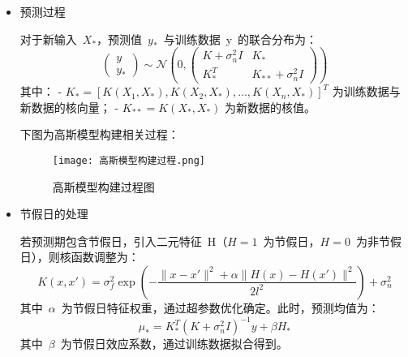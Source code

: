 \documentclass[withoutpreface,bwprint]{cumcmthesis}
\begin{document}
\begin{itemize}
    \item 预测过程
    \par
    对于新输入 \(X_*\)，预测值 \(y_*\) 与训练数据 y 的联合分布为：
    \begin{equation}
        \begin{pmatrix}
            y \\
            y_*
        \end{pmatrix} \sim \mathcal{N}\left( 0, \begin{pmatrix}
            K + \sigma_n^2 I & K_* \\
            K_*^T & K_{**} + \sigma_n^2 I
        \end{pmatrix} \right)
    \end{equation}
    其中： - \( K_* = [K(X_1, X_*), K(X_2, X_*), \dots, K(X_n, X_*)]^T \) 为训练数据与新数据的核向量； - \( K_{**} = K(X_*, X_*) \) 为新数据的核值。 
\par
    下图为高斯模型构建相关过程：
        \begin{figure}[H]
        \centering
        \texttt{[image: 高斯模型构建过程.png]}
        \caption{高斯模型构建过程图}
        \label{fig:单图}
        \end{figure}
    \par
    \item 节假日的处理
    \par
    若预测期包含节假日，引入二元特征 H（\(H=1\) 为节假日，\(H=0\) 为非节假日），则核函数调整为：
    \begin{equation}
        K(x, x') = \sigma_f^2 \exp\left(-\frac{\|x - x'\|^2 + \alpha \|H(x) - H(x')\|^2}{2l^2}\right) + \sigma_n^2
    \end{equation}
    其中 \(\alpha\) 为节假日特征权重，通过超参数优化确定。此时，预测均值为：
    \begin{equation}
        \mu_* = K_*^T(K + \sigma_n^2 I)^{-1}y + \beta H_*
    \end{equation}
    其中 \(\beta\) 为节假日效应系数，通过训练数据拟合得到。
\end{itemize}
\end{document}
